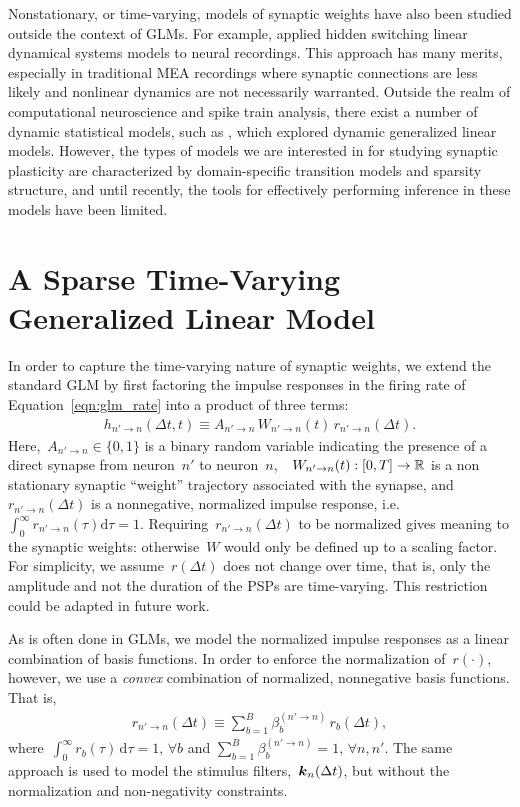 Nonstationary, or time-varying, models of synaptic weights have also
been studied outside the context of GLMs. For example,
\citet{Petreska-2011} applied hidden switching linear dynamical
systems models to neural recordings. This approach has many merits,
especially in traditional MEA recordings where synaptic connections
are less likely and nonlinear dynamics are not necessarily
warranted. Outside the realm of computational neuroscience and spike
train analysis, there exist a number of dynamic statistical models,
such as \citet{West-1985}, which explored dynamic generalized linear
models. However, the types of models we are interested in for studying
synaptic plasticity are characterized by domain-specific transition
models and sparsity structure, and until recently, the tools for
effectively performing inference in these models have been limited.


\section{A Sparse Time-Varying Generalized Linear Model}
In order to capture the time-varying nature of synaptic weights, we
extend the standard GLM by first factoring the impulse responses in
the firing rate of Equation~\ref{eqn:glm_rate} into a product of three
terms:
\begin{align}
\label{eqn:tvwglm_ir}
h_{n' \to n}(\Delta t, t) \equiv A_{n'\to n}\,W_{n' \to n}(t)\,r_{n' \to n}(\Delta t).
\end{align}%
Here,~${A_{n'\to n}\in\{0,1\}}$ is a binary random variable indicating
the presence of a direct synapse from neuron~$n'$ to
neuron~$n$,~~${W_{n'\to n}(t): [0,T]\to \mathbb{R}}$ is a non stationary
synaptic ``weight'' trajectory associated with the synapse, and~$r_{n'
  \to n}(\Delta t)$ is a nonnegative, normalized impulse response,
i.e. ~${\int_0^\infty r_{n' \to n}(\tau)\mathrm{d}\tau =
  1}$. Requiring~${r_{n' \to n}(\Delta t)}$ to be normalized gives
meaning to the synaptic weights: otherwise~$W$ would only be defined
up to a scaling factor. For simplicity, we assume~$r(\Delta t)$ does
not change over time, that is, only the amplitude and not the duration
of the PSPs are time-varying. This restriction could be adapted in
future work.

As is often done in GLMs, we model the normalized impulse responses as
a linear combination of basis functions. In order to enforce the
normalization of~$r(\cdot)$, however, we use a \emph{convex}
combination of normalized, nonnegative basis functions. That is,
\begin{align*}
r_{n' \to n}(\Delta t) \equiv \sum_{b=1}^B \beta^{(n' \to n)}_{b}\, r_b(\Delta t),
\end{align*}
where~${\int_0^\infty r_b(\tau)\,\mathrm{d} \tau = 1,\,\forall b}$ and ${\sum_{b=1}^B \beta^{(n' \to n)}_{b} = 1,\,\forall n,n'}$. The same approach is used to model the stimulus filters,~$\boldsymbol{k}_n(\Delta t)$, but without the normalization and non-negativity constraints.

